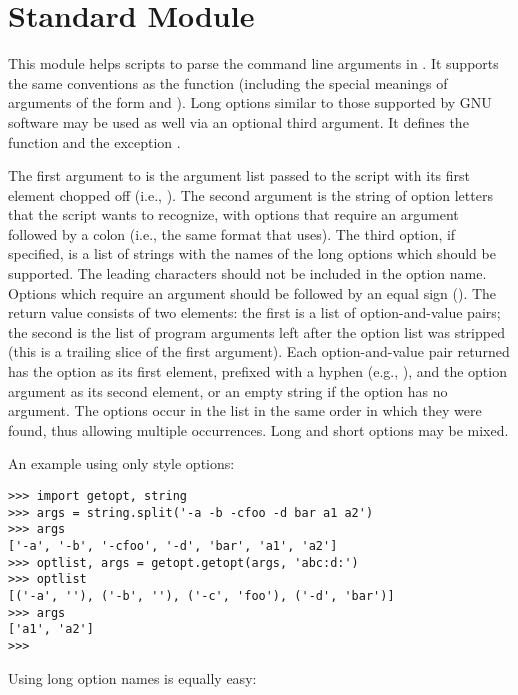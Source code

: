 \section{Standard Module }

This module helps scripts to parse the command line arguments in
.
It supports the same conventions as the \UNIX{}
function (including the special meanings of arguments of the form
\samp{-} and \samp{--}).  Long options similar to those supported by
GNU software may be used as well via an optional third argument.
It defines the function
and the exception
.

The first argument to
is the argument list passed to the script with its first element
chopped off (i.e.,
).
The second argument is the string of option letters that the
script wants to recognize, with options that require an argument
followed by a colon (i.e., the same format that \UNIX{}
uses).
The third option, if specified, is a list of strings with the names of
the long options which should be supported.  The leading 
characters should not be included in the option name.  Options which
require an argument should be followed by an equal sign ().
The return value consists of two elements: the first is a list of
option-and-value pairs; the second is the list of program arguments
left after the option list was stripped (this is a trailing slice of the
first argument).
Each option-and-value pair returned has the option as its first element,
prefixed with a hyphen (e.g.,
),
and the option argument as its second element, or an empty string if the
option has no argument.
The options occur in the list in the same order in which they were
found, thus allowing multiple occurrences.  Long and short options may
be mixed.

An example using only \UNIX{} style options:

\bcode\begin{verbatim}
>>> import getopt, string
>>> args = string.split('-a -b -cfoo -d bar a1 a2')
>>> args
['-a', '-b', '-cfoo', '-d', 'bar', 'a1', 'a2']
>>> optlist, args = getopt.getopt(args, 'abc:d:')
>>> optlist
[('-a', ''), ('-b', ''), ('-c', 'foo'), ('-d', 'bar')]
>>> args
['a1', 'a2']
>>> 
\end{verbatim}\ecode

Using long option names is equally easy:

